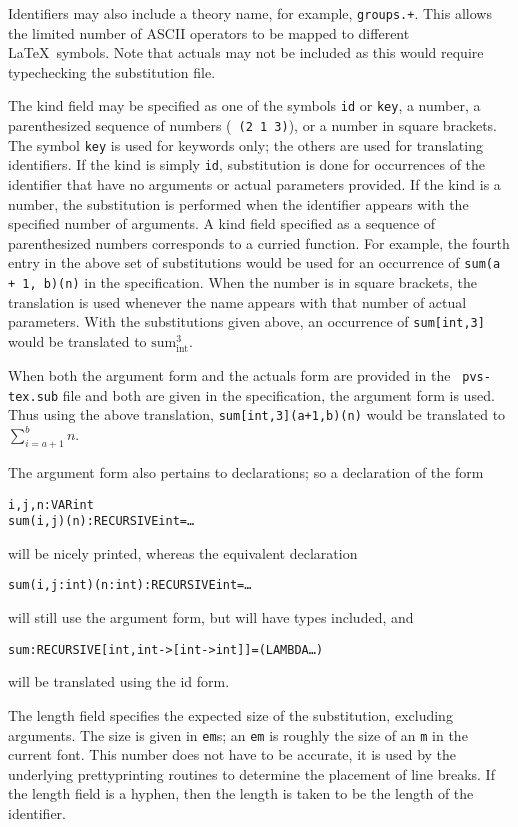 Identifiers may also include a theory name, for example,
\texttt{groups.+}.  This allows the limited number of ASCII operators to
be mapped to different \LaTeX\ symbols.  Note that actuals may not be
included as this would require typechecking the substitution file.

The kind field may be specified as one of the symbols \texttt{id} or
\texttt{key}, a number, a parenthesized sequence of numbers (\eg\ {\tt (2
1 3)}), or a number in square brackets.  The symbol \texttt{key} is used
for keywords only; the others are used for translating identifiers.  If
the kind is simply \texttt{id}, substitution is done for occurrences of
the identifier that have no arguments or actual
parameters provided.  If the kind is a number, the
substitution is performed when the identifier appears with the specified
number of arguments.  A kind field specified as a sequence of
parenthesized numbers corresponds to a curried function.  For example, the
fourth entry in the above set of substitutions would be used for an
occurrence of \texttt{sum(a + 1, b)(n)} in the specification.  When the
number is in square brackets, the translation is used whenever the name
appears with that number of actual parameters.  With the substitutions
given above, an occurrence of \texttt{sum[int,3]} would be translated to
$\textrm{sum}_{\textrm{int}}^{3}$.

When both the argument form and the actuals form are provided in the {\tt
pvs-tex.sub} file and both are given in the specification, the argument
form is used.  Thus using the above translation,
\texttt{sum[int,3](a+1,b)(n)} would be translated to $\sum_{i={a+1}}^{b}
n$.

The argument form also pertains to declarations; so a declaration of the
form
\begin{alltt}
  i,j,n: VAR int
  sum(i,j)(n): RECURSIVE int = \ldots
\end{alltt}
will be nicely printed, whereas the equivalent declaration
\begin{alltt}
  sum(i,j:int)(n:int): RECURSIVE int = \ldots
\end{alltt}
will still use the argument form, but will have types included, and
\begin{alltt}
  sum: RECURSIVE [int, int -> [int -> int]] = (LAMBDA \ldots )
\end{alltt}
will be translated using the id form.

The length field specifies the expected size of the substitution,
excluding arguments.  The size is given in \texttt{em}s; an \texttt{em} is
roughly the size of an \texttt{m} in the current font.  This number does not
have to be accurate, it is used by the underlying prettyprinting routines
to determine the placement of line breaks.  If the length field is a
hyphen, then the length is taken to be the length of the identifier.

